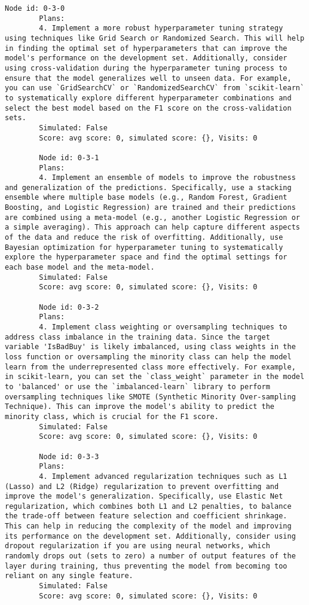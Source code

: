 \begin{lstlisting}[style=txtfile]
		Node id: 0-3-0
		Plans: 
		4. Implement a more robust hyperparameter tuning strategy using techniques like Grid Search or Randomized Search. This will help in finding the optimal set of hyperparameters that can improve the model's performance on the development set. Additionally, consider using cross-validation during the hyperparameter tuning process to ensure that the model generalizes well to unseen data. For example, you can use `GridSearchCV` or `RandomizedSearchCV` from `scikit-learn` to systematically explore different hyperparameter combinations and select the best model based on the F1 score on the cross-validation sets.
		Simulated: False
		Score: avg score: 0, simulated score: {}, Visits: 0

		Node id: 0-3-1
		Plans: 
		4. Implement an ensemble of models to improve the robustness and generalization of the predictions. Specifically, use a stacking ensemble where multiple base models (e.g., Random Forest, Gradient Boosting, and Logistic Regression) are trained and their predictions are combined using a meta-model (e.g., another Logistic Regression or a simple averaging). This approach can help capture different aspects of the data and reduce the risk of overfitting. Additionally, use Bayesian optimization for hyperparameter tuning to systematically explore the hyperparameter space and find the optimal settings for each base model and the meta-model.
		Simulated: False
		Score: avg score: 0, simulated score: {}, Visits: 0

		Node id: 0-3-2
		Plans: 
		4. Implement class weighting or oversampling techniques to address class imbalance in the training data. Since the target variable 'IsBadBuy' is likely imbalanced, using class weights in the loss function or oversampling the minority class can help the model learn from the underrepresented class more effectively. For example, in scikit-learn, you can set the `class_weight` parameter in the model to 'balanced' or use the `imbalanced-learn` library to perform oversampling techniques like SMOTE (Synthetic Minority Over-sampling Technique). This can improve the model's ability to predict the minority class, which is crucial for the F1 score.
		Simulated: False
		Score: avg score: 0, simulated score: {}, Visits: 0

		Node id: 0-3-3
		Plans: 
		4. Implement advanced regularization techniques such as L1 (Lasso) and L2 (Ridge) regularization to prevent overfitting and improve the model's generalization. Specifically, use Elastic Net regularization, which combines both L1 and L2 penalties, to balance the trade-off between feature selection and coefficient shrinkage. This can help in reducing the complexity of the model and improving its performance on the development set. Additionally, consider using dropout regularization if you are using neural networks, which randomly drops out (sets to zero) a number of output features of the layer during training, thus preventing the model from becoming too reliant on any single feature.
		Simulated: False
		Score: avg score: 0, simulated score: {}, Visits: 0


\end{lstlisting}
